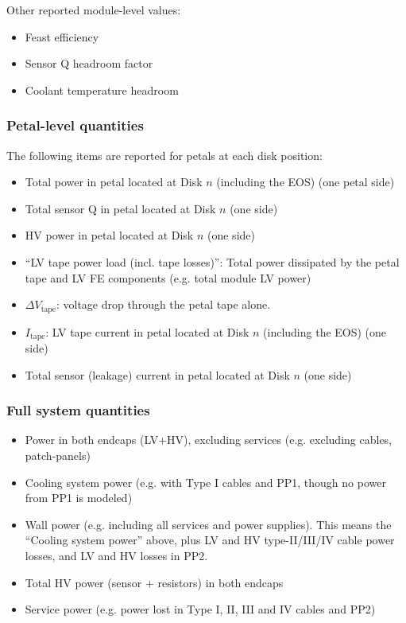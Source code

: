 Other reported module-level values:
\begin{itemize}
\setlength\itemsep{0.0em}
\item Feast efficiency
\item Sensor Q headroom factor
\item Coolant temperature headroom
\end{itemize}

\subsubsection{Petal-level quantities}

The following items are reported for petals at each disk position:
\begin{itemize}
\setlength\itemsep{0.0em}
\item Total power in petal located at Disk $n$ (including the EOS) (one petal side)
\item Total sensor Q in petal located at Disk $n$ (one side)
\item HV power in petal located at Disk $n$ (one side)
\item ``LV tape power load (incl. tape losses)'': Total power dissipated by the petal tape and LV
FE components (e.g. total module LV power)
\item $\Delta V_\text{tape}$: voltage drop through the petal tape alone.
\item $I_\text{tape}$: LV tape current in petal located at Disk $n$ (including the EOS) (one side)
\item Total sensor (leakage) current in petal located at Disk $n$ (one side)
\end{itemize}

\subsubsection{Full system quantities}

\begin{itemize}
\setlength\itemsep{0.0em}
\item Power in both endcaps (LV+HV), excluding services (e.g. excluding cables, patch-panels)
\item Cooling system power (e.g. with Type I cables and PP1, though no power from PP1 is modeled)
\item Wall power (e.g. including all services and power supplies). This means the ``Cooling system power''
  above, plus LV and HV type-II/III/IV cable power losses, and LV and HV losses in PP2.
\item Total HV power (sensor + resistors) in both endcaps
\item Service power (e.g. power lost in Type I, II, III and IV cables and PP2) %
\end{itemize}

